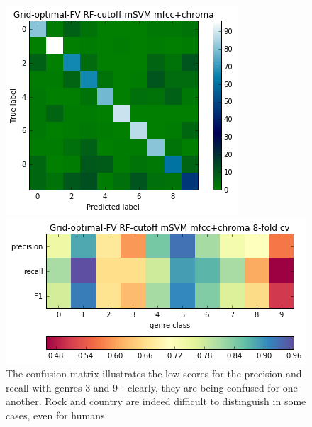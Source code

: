 \documentclass[9pt]{article}
\begin{document}
\begin{figure}[H]
    \centering
    
    \begin{minipage}[b]{0.3\textwidth}
        \includegraphics[width=\textwidth]{final-confusion.png}
    \end{minipage}
    \hfill
    \begin{minipage}[b]{0.5\textwidth}
        \includegraphics[width=\textwidth]{prf.png}
    \end{minipage}
    \label{fig:finalconf}
    \caption{The confusion matrix illustrates the low scores for the precision and recall with genres 3 and 9 - clearly, they are being confused for one another. Rock and country are indeed difficult to distinguish in some cases, even for humans.}
\end{figure}
\end{document}
